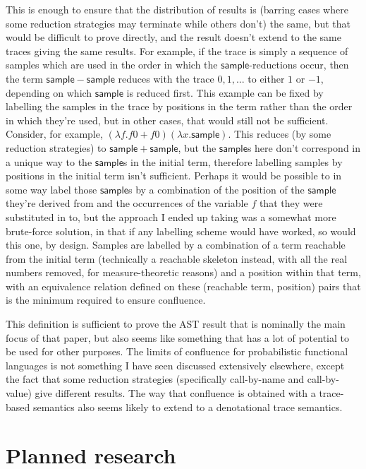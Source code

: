 \documentclass[titlepage]{article}
\newcommand{\tsample}{\mathsf{sample}}
\begin{document}
This is enough to ensure that the distribution of results is (barring cases where some reduction strategies may terminate while others don't) the same, but that would be difficult to prove directly, and the result doesn't extend to the same traces giving the same results. For example, if the trace is simply a sequence of samples which are used in the order in which the $\tsample$-reductions occur, then the term $\tsample - \tsample$ reduces with the trace $0, 1, ...$ to either $1$ or $-1$, depending on which $\tsample$ is reduced first. This example can be fixed by labelling the samples in the trace by positions in the term rather than the order in which they're used, but in other cases, that would still not be sufficient. Consider, for example, $(\lambda f. f 0 + f 0) (\lambda x. \tsample)$. This reduces (by some reduction strategies) to $\tsample + \tsample$, but the $\tsample$s here don't correspond in a unique way to the $\tsample$s in the initial term, therefore labelling samples by positions in the initial term isn't sufficient. Perhaps it would be possible to in some way label those $\tsample$s by a combination of the position of the $\tsample$ they're derived from and the occurrences of the variable $f$ that they were substituted in to, but the approach I ended up taking was a somewhat more brute-force solution, in that if any labelling scheme would have worked, so would this one, by design. Samples are labelled by a combination of a term reachable from the initial term (technically a reachable skeleton instead, with all the real numbers removed, for measure-theoretic reasons) and a position within that term, with an equivalence relation defined on these (reachable term, position) pairs that is the minimum required to ensure confluence.

This definition is sufficient to prove the AST result that is nominally the main focus of that paper, but also seems like something that has a lot of potential to be used for other purposes. The limits of confluence for probabilistic functional languages is not something I have seen discussed extensively elsewhere, except the fact that some reduction strategies (specifically call-by-name and call-by-value) give different results. The way that confluence is obtained with a trace-based semantics also seems likely to extend to a denotational trace semantics.

\section{Planned research}
\end{document}

